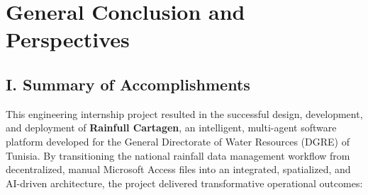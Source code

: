 \documentclass[12pt,a4paper]{report}
\begin{document}
\newpage

\chapter*{General Conclusion and Perspectives}

\section*{I. Summary of Accomplishments}

This engineering internship project resulted in the successful design, development, and deployment of \textbf{Rainfull Cartagen}, an intelligent, multi-agent software platform developed for the General Directorate of Water Resources (DGRE) of Tunisia. By transitioning the national rainfall data management workflow from decentralized, manual Microsoft Access files into an integrated, spatialized, and AI-driven architecture, the project delivered transformative operational outcomes:
\end{document}
